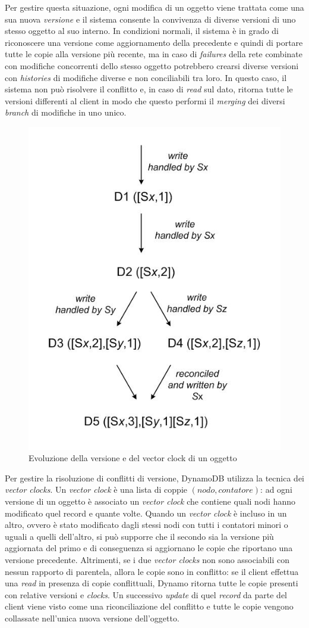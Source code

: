 Per gestire questa situazione, ogni modifica di un oggetto viene trattata come una sua nuova \textit{versione} e il sistema consente la convivenza di diverse versioni di uno stesso oggetto al suo interno. In condizioni normali, il sistema è in grado di riconoscere una versione come aggiornamento della precedente e quindi di portare tutte le copie alla versione più recente, ma in caso di \textit{failures} della rete combinate con modifiche concorrenti dello stesso oggetto potrebbero crearsi diverse versioni con \textit{histories} di modifiche diverse e non conciliabili tra loro. In questo caso, il sistema non può risolvere il conflitto e, in caso di \textit{read} sul dato, ritorna tutte le versioni differenti al client in modo che questo performi il \textit{merging} dei diversi \textit{branch} di modifiche in uno unico.


\begin{figure}[!ht]
    \centering
    \includegraphics[width=.5\textwidth]{images/vectorclock.png}
    \caption{Evoluzione della versione e del vector clock di un oggetto}
    \label{fig:vecclock}
\end{figure}

Per gestire la risoluzione di conflitti di versione, DynamoDB utilizza la tecnica dei \textit{vector clocks}. Un \textit{vector clock} è una lista di coppie $(nodo, contatore)$: ad ogni versione di un oggetto è associato un \textit{vector clock} che contiene quali nodi hanno modificato quel record e quante volte. Quando un \textit{vector clock} è incluso in un altro, ovvero è stato modificato dagli stessi nodi con tutti i contatori minori o uguali a quelli dell'altro, si può supporre che il secondo sia la versione più aggiornata del primo e di conseguenza si aggiornano le copie che riportano una versione precedente. Altrimenti, se i due \textit{vector clocks} non sono associabili con nessun rapporto di parentela, allora le copie sono in conflitto: se il client effettua una \textit{read} in presenza di copie conflittuali, Dynamo ritorna tutte le copie presenti con relative versioni e \textit{clocks}. Un successivo \textit{update} di quel \textit{record} da parte del client viene visto come una riconciliazione del conflitto e tutte le copie vengono collassate nell'unica nuova versione dell'oggetto.